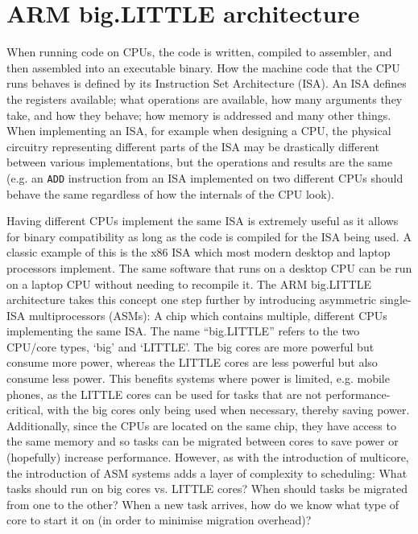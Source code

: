 \section{ARM big.LITTLE architecture}
When running code on CPUs, the code is written, compiled to assembler, and then
assembled into an executable binary. How the machine code that the CPU runs
behaves is defined by its Instruction Set Architecture (ISA). An ISA defines the
registers available; what operations are available, how many arguments they
take, and how they behave; how memory is addressed and many other things. When
implementing an ISA, for example when designing a CPU, the physical circuitry
representing different parts of the ISA may be drastically different between
various implementations, but the operations and results are the same (e.g. an
\texttt{ADD} instruction from an ISA implemented on two different CPUs should
behave the same regardless of how the internals of the CPU look).

Having different CPUs implement the same ISA is extremely useful as it allows
for binary compatibility as long as the code is compiled for the ISA being used.
A classic example of this is the x86 ISA which most modern desktop and laptop
processors implement. The same software that runs on a desktop CPU can be run on
a laptop CPU without needing to recompile it. The ARM big.LITTLE architecture
takes this concept one step further by introducing asymmetric single-ISA
multiprocessors (ASMs): A chip which contains multiple, different CPUs
implementing the same ISA. The name ``big.LITTLE'' refers to the two CPU/core
types, `big' and `LITTLE'. The big cores are more powerful but consume more
power, whereas the LITTLE cores are less powerful but also consume less power.
This benefits systems where power is limited, e.g. mobile phones, as the LITTLE
cores can be used for tasks that are not performance-critical, with the big
cores only being used when necessary, thereby saving power. Additionally, since
the CPUs are located on the same chip, they have access to the same memory and
so tasks can be migrated between cores to save power or (hopefully) increase
performance. However, as with the introduction of multicore, the introduction of
ASM systems adds a layer of complexity to scheduling: What tasks should run on
big cores vs. LITTLE cores? When should tasks be migrated from one to the other?
When a new task arrives, how do we know what type of core to start it on (in
order to minimise migration overhead)?

